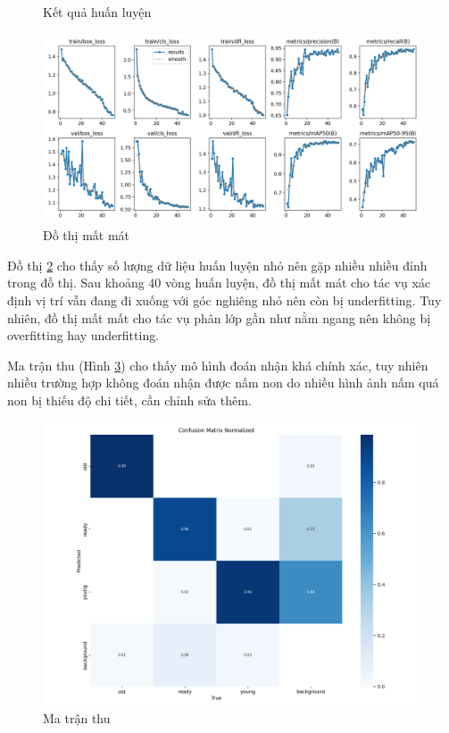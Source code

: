 \begin{figure}
\begin{subfigure}{.5\textwidth}
    \end{subfigure}
    \caption{Kết quả huấn luyện}

    \label{fig:training-result}
\end{figure}

\begin{figure}[h]
    \centering
    \includegraphics[width=0.85\linewidth]{images/results.png}
    \caption{Đồ thị mất mát}
    \label{fig:loss}
\end{figure}

Đồ thị \ref{fig:loss} cho thấy số lượng dữ liệu huấn luyện nhỏ nên gặp nhiều nhiều đỉnh trong đồ thị. Sau khoảng 40 vòng huấn luyện, đồ thị mất mát cho tác vụ xác định vị trí vẫn đang đi xuống với góc nghiêng nhỏ nên còn bị underfitting. Tuy nhiên, đồ thị mất mất cho tác vụ phân lớp gần như nằm ngang nên không bị overfitting hay underfitting. 

Ma trận thu (Hình \ref{fig:confusion-matrix}) cho thấy mô hình đoán nhận khá chính xác, tuy nhiên nhiều trường hợp không đoán nhận được nấm non do nhiều hình ảnh nấm quá non bị thiếu độ chi tiết, cần chỉnh sửa thêm.


\begin{figure}[H]
    \centering
    \includegraphics[width=0.85\linewidth]{images/confusion_matrix_normalized.png}
    \caption{Ma trận thu}
    \label{fig:confusion-matrix}
\end{figure}

